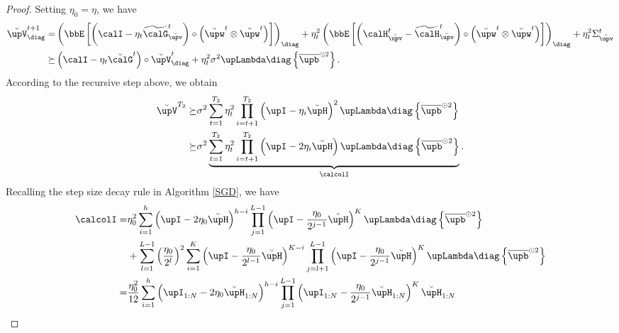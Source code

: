 \begin{proof}
    Setting $\eta_0 = \eta$, we have 
    \begin{align}
        \breve{\upV}_{\diag}^{t+1}=&\left(\bbE\left[\left(\calI-\eta_t\widetilde{\calG}_{\breve{\upv}}^t\right)\circ\left(\breve{\upw}^t\otimes\breve{\upw}^t\right)\right]\right)_{\diag}+\eta_t^2\left(\bbE\left[\left(\calH_{\breve{\upv}}^t-\widetilde{\calH}_{\breve{\upv}}^t\right)\circ\left(\breve{\upw}^t\otimes\breve{\upw}^t\right)\right]\right)_{\diag}+\eta_t^2\Sigma_{\breve{\upv}}^t\notag
        \\
        \succeq&\left(\calI-\eta_t\breve{\calG}^t\right)\circ\breve{\upV}_{\diag}^t+\eta_t^2\sigma^2\upLambda\diag\left\{\overline{\upb}^{\odot2}\right\}.\notag
    \end{align}
    According to the recursive step above, we obtain
    \begin{align}\label{lower-bound-proof-I}
        \breve{\upV}^{T_2}
        \succeq&\sigma^2\sum_{t=1}^{T_2}\eta_t^2\prod_{i=t+1}^{T_2}\left(\upI-\eta_i\breve{\upH}\right)^2\upLambda\diag\left\{\overline{\upb}^{\odot2}\right\}\notag
        \\
        \succeq&\sigma^2\underbrace{\sum_{t=1}^{T_2}\eta_t^2\prod_{i=t+1}^{T_2}\left(\upI-2\eta_i\breve{\upH}\right)\upLambda\diag\left\{\overline{\upb}^{\odot2}\right\}}_{\calcolI}.
    \end{align}
    Recalling the step size decay rule in Algorithm \ref{SGD}, we have
    \begin{align}\label{lower-bound-proof-2}
        \calcolI=&\eta_0^2\sum_{i=1}^h\left(\upI-2\eta_0\breve{\upH}\right)^{h-i}\prod_{j=1}^{L-1}\left(\upI-\frac{\eta_0}{2^{j-1}}\breve{\upH}\right)^K\upLambda\diag\left\{\overline{\upb}^{\odot2}\right\}\notag
	\\
	&+\sum_{l=1}^{L-1}\left(\frac{\eta_0}{2^l}\right)^2\sum_{i=1}^K\left(\upI-\frac{\eta_0}{2^{l-1}}\breve{\upH}\right)^{K-i}\prod_{j=l+1}^{L-1}\left(\upI-\frac{\eta_0}{2^{j-1}}\breve{\upH}\right)^K\upLambda\diag\left\{\overline{\upb}^{\odot2}\right\}\notag
	\\
	=&\frac{\eta_0^2}{12}\sum_{i=1}^h\left(\upI_{1:N}-2\eta_0\breve{\upH}_{1:N}\right)^{h-i}\prod_{j=1}^{L-1}\left(\upI_{1:N}-\frac{\eta_0}{2^{j-1}}\breve{\upH}_{1:N}\right)^K\breve{\upH}_{1:N}\notag
	\\

\end{align}
\end{proof}
